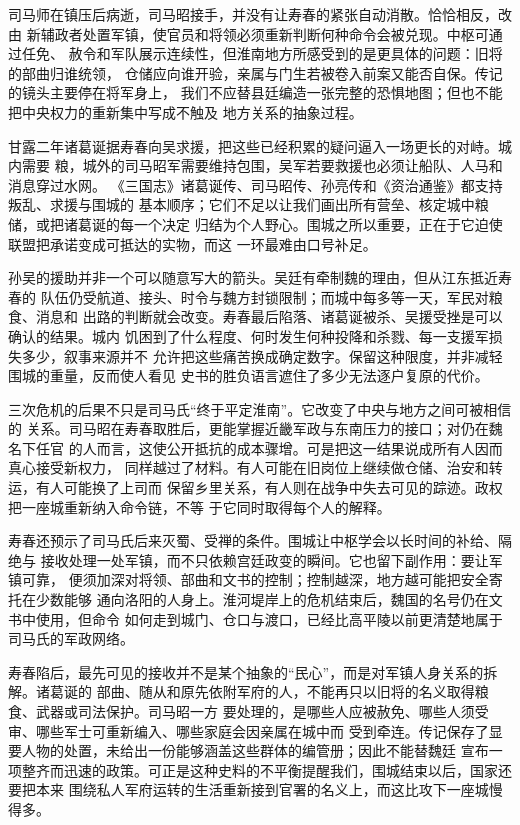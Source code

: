 司马师在镇压后病逝，司马昭接手，并没有让寿春的紧张自动消散。恰恰相反，改由
新辅政者处置军镇，使官员和将领必须重新判断何种命令会被兑现。中枢可通过任免、
赦令和军队展示连续性，但淮南地方所感受到的是更具体的问题：旧将的部曲归谁统领，
仓储应向谁开验，亲属与门生若被卷入前案又能否自保。传记的镜头主要停在将军身上，
我们不应替县廷编造一张完整的恐惧地图；但也不能把中央权力的重新集中写成不触及
地方关系的抽象过程。

甘露二年诸葛诞据寿春向吴求援，把这些已经积累的疑问逼入一场更长的对峙。城内需要
粮，城外的司马昭军需要维持包围，吴军若要救援也必须让船队、人马和消息穿过水网。
《三国志》诸葛诞传、司马昭传、孙亮传和《资治通鉴》都支持叛乱、求援与围城的
基本顺序；它们不足以让我们画出所有营垒、核定城中粮储，或把诸葛诞的每一个决定
归结为个人野心。围城之所以重要，正在于它迫使联盟把承诺变成可抵达的实物，而这
一环最难由口号补足。

孙吴的援助并非一个可以随意写大的箭头。吴廷有牵制魏的理由，但从江东抵近寿春的
队伍仍受航道、接头、时令与魏方封锁限制；而城中每多等一天，军民对粮食、消息和
出路的判断就会改变。寿春最后陷落、诸葛诞被杀、吴援受挫是可以确认的结果。城内
饥困到了什么程度、何时发生何种投降和杀戮、每一支援军损失多少，叙事来源并不
允许把这些痛苦换成确定数字。保留这种限度，并非减轻围城的重量，反而使人看见
史书的胜负语言遮住了多少无法逐户复原的代价。

三次危机的后果不只是司马氏“终于平定淮南”。它改变了中央与地方之间可被相信的
关系。司马昭在寿春取胜后，更能掌握近畿军政与东南压力的接口；对仍在魏名下任官
的人而言，这使公开抵抗的成本骤增。可是把这一结果说成所有人因而真心接受新权力，
同样越过了材料。有人可能在旧岗位上继续做仓储、治安和转运，有人可能换了上司而
保留乡里关系，有人则在战争中失去可见的踪迹。政权把一座城重新纳入命令链，不等
于它同时取得每个人的解释。

寿春还预示了司马氏后来灭蜀、受禅的条件。围城让中枢学会以长时间的补给、隔绝与
接收处理一处军镇，而不只依赖宫廷政变的瞬间。它也留下副作用：要让军镇可靠，
便须加深对将领、部曲和文书的控制；控制越深，地方越可能把安全寄托在少数能够
通向洛阳的人身上。淮河堤岸上的危机结束后，魏国的名号仍在文书中使用，但命令
如何走到城门、仓口与渡口，已经比高平陵以前更清楚地属于司马氏的军政网络。

寿春陷后，最先可见的接收并不是某个抽象的“民心”，而是对军镇人身关系的拆解。诸葛诞的
部曲、随从和原先依附军府的人，不能再只以旧将的名义取得粮食、武器或司法保护。司马昭一方
要处理的，是哪些人应被赦免、哪些人须受审、哪些军士可重新编入、哪些家庭会因亲属在城中而
受到牵连。传记保存了显要人物的处置，未给出一份能够涵盖这些群体的编管册；因此不能替魏廷
宣布一项整齐而迅速的政策。可正是这种史料的不平衡提醒我们，围城结束以后，国家还要把本来
围绕私人军府运转的生活重新接到官署的名义上，而这比攻下一座城慢得多。

